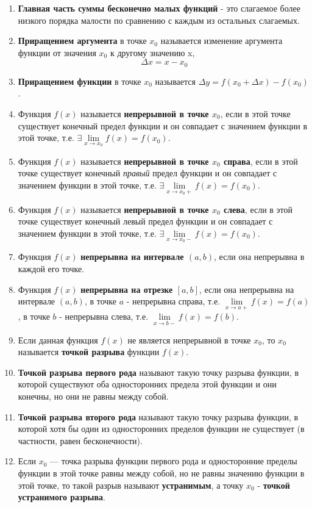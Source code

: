 \begin{enumerate}
\item \textbf{Главная часть суммы бесконечно малых функций} - это слагаемое более низкого порядка малости по сравнению с каждым из остальных слагаемых.
\item \textbf{Приращением аргумента} в точке $x_0$ называется изменение аргумента функции от значения $x_0$ к другому значению x, $$\Delta x = x - x_0$$
\item \textbf{Приращением функции} в точке $x_0$ называется $\Delta y = f(x_0 + \Delta x) - f(x_0)$.
\item Функция $f(x)$ называется \textbf{непрерывной в точке $x_0$}, если в этой точке существует конечный предел функции и он совпадает с значением функции в этой точке, т.е. $\exists \lim\limits_{x \to x_0}f(x) = f(x_0)$.
\item Функция $f(x)$ называется \textbf{непрерывной в точке $x_0$ справа}, если в этой точке существует конечный \textit{правый} предел функции и он совпадает с значением функции в этой точке, т.е. $\exists \lim\limits_{x \to x_0+}f(x) = f(x_0)$.
\item Функция $f(x)$ называется \textbf{непрерывной в точке $x_0$ слева}, если в этой точке существует конечный левый предел функции и он совпадает с значением функции в этой точке, т.е. $\exists \lim\limits_{x \to x_0-}f(x) = f(x_0)$.
\item Функция $f(x)$ \textbf{непрерывна на интервале $(a, b)$}, если она непрерывна в каждой его точке.
\item Функция $f(x)$ \textbf{непрерывна на отрезке $[a, b]$}, если она непрерывна на интервале $(a, b)$, в точке $a$ - непрерывна справа, т.е. $\lim\limits_{x \to a+}f(x) = f(a)$, в точке $b$ - непрерывна слева, т.е. $\lim\limits_{x \to b-}f(x) = f(b)$.
\item Если данная функция $f(x)$ не является непрерывной в точке $x_0$, то $x_0$ называется \textbf{точкой разрыва} функции $f(x)$.
\item \textbf{Точкой разрыва первого рода} называют такую точку разрыва функции, в которой существуют оба односторонних предела этой функции и они конечны, но они не равны между собой.
\item \textbf{Точкой разрыва второго рода} называют такую точку разрыва функции, в которой хотя бы один из односторонних пределов функции не существует (в частности, равен бесконечности).
\item Если $x_0$ — точка разрыва функции первого рода и односторонние пределы функции в этой точке равны между собой, но не равны значению функции в этой точке, то такой разрыв называют \textbf{устранимым}, а точку $x_0$ - \textbf{точкой устранимого разрыва}.

\end{enumerate}
